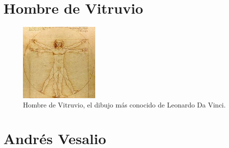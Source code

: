 \section{Hombre de Vitruvio} \label{app:vitruvio}

\begin{figure}[H]
    \centering
    \includegraphics[width=0.35\textwidth]{vitruvio2.jpg}
    \caption{Hombre de Vitruvio, el dibujo más conocido de Leonardo Da Vinci.\cite{RefWorks:71}} %
\end{figure}

\section{Andrés Vesalio} \label{app:vesalio}

